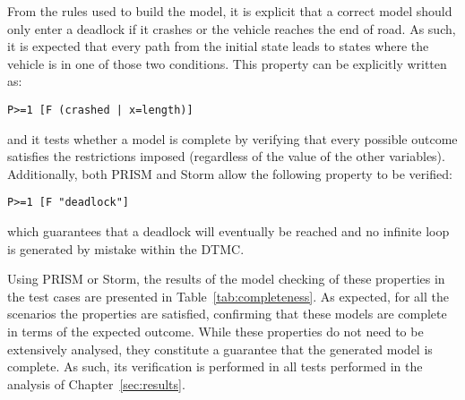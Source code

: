 From the rules used to build the model, it is explicit that a correct model should only enter a deadlock if it crashes or the vehicle reaches the end of road. As such, it is expected that every path from the initial state leads to states where the vehicle is in one of those two conditions. This property can be explicitly written as:

\begin{minipage}{\linewidth}
{\vspace{1em}
\begin{lstlisting}
P>=1 [F (crashed | x=length)]
\end{lstlisting}
}
\end{minipage}

and it tests whether a model is complete by verifying that every possible outcome satisfies the restrictions imposed (regardless of the value of the other variables). Additionally, both PRISM and Storm allow the following property to be verified:

\begin{minipage}{\linewidth}
{\vspace{1em}
\begin{lstlisting}
P>=1 [F "deadlock"]
\end{lstlisting}
}
\end{minipage}

which guarantees that a deadlock will eventually be reached and no infinite loop  is generated by mistake within the DTMC.

Using PRISM or Storm, the results of the model checking of these properties in the test cases are presented in Table~\ref{tab:completeness}. As expected, for all the scenarios the properties are satisfied, confirming that these models are complete in terms of the expected outcome. While these properties do not need to be extensively analysed, they constitute a guarantee that the generated model is complete. As such, its verification is performed in all tests performed in the analysis of Chapter~\ref{sec:results}.

